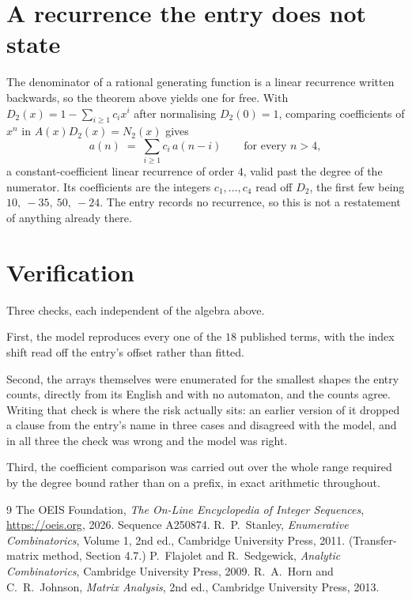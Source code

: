 \documentclass[11pt,a4paper]{article}
\theoremstyle{plain}
\theoremstyle{definition}
\begin{document}
\section{A recurrence the entry does not state}

The denominator of a rational generating function is a linear recurrence written backwards, so
the theorem above yields one for free. With $D_2(x)=1-\sum_{i\ge1}c_ix^i$ after normalising
$D_2(0)=1$, comparing coefficients of $x^n$ in $A(x)D_2(x)=N_2(x)$ gives
\[
a(n)\;=\;\sum_{i\ge1}c_i\,a(n-i)\qquad\text{for every }n>4,
\]
a constant-coefficient linear recurrence of order $4$, valid past the degree of the
numerator. Its coefficients are the integers $c_1,\dots,c_{4}$ read off $D_2$, the first few being $10,\ -35,\ 50,\ -24$. The entry records no recurrence, so this is not a restatement of anything
already there.

\section{Verification}

Three checks, each independent of the algebra above.

First, the model reproduces every one of the $18$ published terms, with the index shift
read off the entry's offset rather than fitted.

Second, the arrays themselves were enumerated for the smallest shapes the entry counts,
directly from its English and with no automaton, and the counts agree. Writing that check is
where the risk actually sits: an earlier version of it dropped a clause from the entry's name
in three cases and disagreed with the model, and in all three the check was wrong and the model
was right.

Third, the coefficient comparison was carried out over the whole range required by the degree
bound rather than on a prefix, in exact arithmetic throughout.

\begin{thebibliography}{9}
 The OEIS Foundation, \emph{The On-Line Encyclopedia of Integer
Sequences}, \url{https://oeis.org}, 2026. Sequence A250874.
 R.~P.~Stanley, \emph{Enumerative Combinatorics}, Volume 1, 2nd ed.,
Cambridge University Press, 2011. (Transfer-matrix method, Section 4.7.)
 P.~Flajolet and R.~Sedgewick, \emph{Analytic Combinatorics}, Cambridge
University Press, 2009.
 R.~A.~Horn and C.~R.~Johnson, \emph{Matrix Analysis}, 2nd ed., Cambridge
University Press, 2013.
\end{thebibliography}
\end{document}
